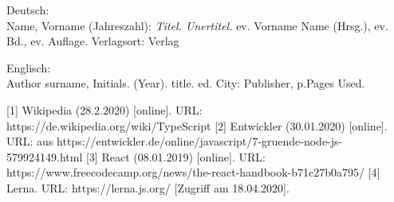 \documentclass[11pt,a4paper,titlepage]{article}
\begin{document}
Deutsch:\\
Name, Vorname (Jahreszahl): \textit{Titel. Unertitel.} ev. Vorname Name (Hrsg.), ev. Bd., ev. Auflage. Verlagsort: Verlag 

Englisch:\\
Author surname, Initials. (Year). title. ed. City: Publisher, p.Pages Used.

[1] Wikipedia (28.2.2020) [online]. URL: https://de.wikipedia.org/wiki/TypeScript
[2] Entwickler (30.01.2020)  [online]. URL: aus https://entwickler.de/online/javascript/7-gruende-node-js-579924149.html
[3] React (08.01.2019) [online]. URL: https://www.freecodecamp.org/news/the-react-handbook-b71c27b0a795/
[4] Lerna. URL: https://lerna.js.org/  [Zugriff am 18.04.2020].
\end{document}
